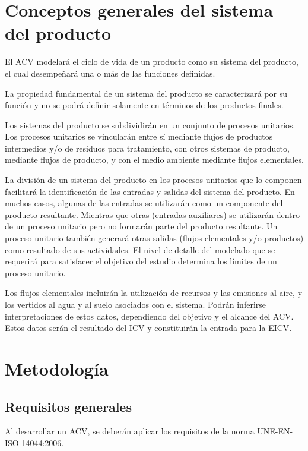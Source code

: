 \section{Conceptos generales del sistema del producto}

El ACV modelará el ciclo de vida de un producto como su sistema del producto, el cual desempeñará una o más de las funciones definidas.

La propiedad fundamental de un sistema del producto se caracterizará por su función y no se podrá definir solamente en términos de los productos finales.

Los sistemas del producto se subdividirán en un conjunto de procesos unitarios. Los procesos unitarios se vincularán entre sí mediante flujos de productos intermedios y/o de residuos para tratamiento, con otros sistemas de producto, mediante flujos de producto, y con el medio ambiente mediante flujos elementales.

La división de un sistema del producto en los procesos unitarios que lo componen facilitará la identificación de las entradas y salidas del sistema del producto. En muchos casos, algunas de las entradas se utilizarán como un componente del producto resultante. Mientras que otras (entradas auxiliares) se utilizarán dentro de un proceso unitario pero no formarán parte del producto resultante. Un proceso unitario también generará otras salidas (flujos elementales y/o productos) como resultado de sus actividades. El nivel de detalle del modelado que se requerirá para satisfacer el objetivo del estudio determina los límites de un proceso unitario.

Los flujos elementales incluirán la utilización de recursos y las emisiones al aire, y los vertidos al agua y al suelo asociados con el sistema. Podrán inferirse interpretaciones de estos datos, dependiendo del objetivo y el alcance del ACV. Estos datos serán el resultado del ICV y constituirán la entrada para la EICV.

\section{Metodología}
\subsection{Requisitos generales}

Al desarrollar un ACV, se deberán aplicar los requisitos de la norma UNE-EN-ISO 14044:2006.

